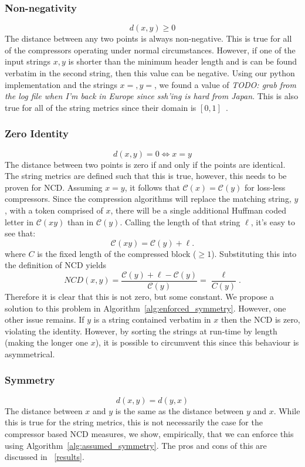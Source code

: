 \documentclass{article}
\newcommand{\cm}[1]{\textit{{\color{blue}#1}}}
\begin{document}
\subsubsection{Non-negativity} 
\[
d(x, y) \geq 0
\]
The distance between any two points is always non-negative. This is true for all of the compressors operating under normal circumstances. However, if one of the input strings $x,y$ is shorter than the minimum header length and is can be found verbatim in the second string, then this value can be negative. Using our python implementation and the strings $x=, y=$, we found a value of \cm{TODO: grab from the log file when I'm back in Europe since ssh'ing is hard from Japan}. This is also true for all of the string metrics since their domain is $[0,1]$~\cite{metrics,levenshtein}. 


\subsubsection{Zero Identity} 
\[
d(x, y) = 0 \iff x = y
\]
The distance between two points is zero if and only if the points are identical. The string metrics are defined such that this is true, however, this needs to be proven for NCD.
Assuming $x = y$, it follows that $\mathcal{C}(x) = \mathcal{C}(y)$ for loss-less compressors.
Since the compression algorithms will replace the matching string, $y$, with a token comprised of $x$, there will be a single additional Huffman coded letter in $\mathcal{C}(xy)$ than in $\mathcal{C}(y)$. Calling the length of that  string $\ell$, it's easy to see that:
$$
\mathcal{C}(xy) = \mathcal{C}(y) + \ell.
$$
where $C$ is the fixed length of the compressed block ($\geq 1$).
Substituting this into the definition of NCD yields
$$
NCD(x,y) = \frac{\mathcal{C}(y) + \ell - \mathcal{C}(y)}{\mathcal{C}(y)} = \frac{\ell}{C(y)}.
$$
Therefore it is clear that this is not zero, but some constant. We propose a solution to this problem in Algorithm~\ref{alg:enforced_symmetry}. However, one other issue remains. If $y$ is a string contained verbatim in $x$ then the NCD is zero, violating the identity. However, by sorting the strings at run-time by length (making the longer one $x$), it is possible to circumvent this since this behaviour is asymmetrical. 



\subsubsection{Symmetry} 
\[
d(x, y) = d(y, x)
\]
The distance between \( x \) and \( y \) is the same as the distance between \( y \) and \( x \). While this is true for the string metrics, this is not necessarily the case for the compressor based NCD measures, we show, empirically, that we can enforce this using Algorithm~\ref{alg:assumed_symmetry}. The pros and cons of this are discussed in ~\ref{results}.
\end{document}
